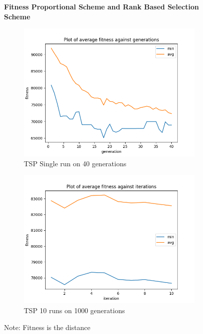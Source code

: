 \documentclass[a4paper]{exam}
\begin{document}
\begin{questions}
  \begin{figure}[!ht]
    \centering
    \textbf{Fitness Proportional Scheme and Rank Based Selection Scheme}
    \begin{subfigure}{.5\textwidth}
      \centering
      \includegraphics[width=1\linewidth]{images/tsp_fps_rbs_gen.png}
      \caption{TSP Single run on 40 generations}
      \label{fig:tsp_fps_rbs_sub1}
    \end{subfigure}%
    \begin{subfigure}{.5\textwidth}
      \centering
      \includegraphics[width=1\linewidth]{images/tsp_fps_rbs_itr.png}
      \caption{TSP 10 runs on 1000 generations}
      \label{fig:tsp_fps_rbs_sub2}
    \end{subfigure}
    \caption{Note: Fitness is the distance}
    \label{fig:tsp_fps_rbs}
  \end{figure}


\end{questions}
\end{document}
